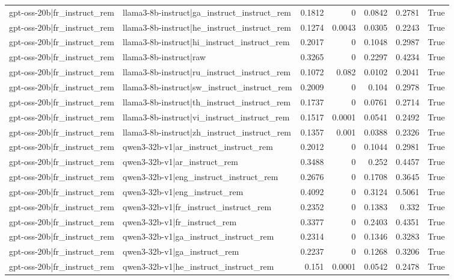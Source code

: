 \begin{table}
\begin{tabular}{l l r r r r l}
gpt-oss-20b|fr_instruct_rem & llama3-8b-instruct|ga_instruct_instruct_rem & 0.1812 & 0 & 0.0842 & 0.2781 & True \\
gpt-oss-20b|fr_instruct_rem & llama3-8b-instruct|he_instruct_instruct_rem & 0.1274 & 0.0043 & 0.0305 & 0.2243 & True \\
gpt-oss-20b|fr_instruct_rem & llama3-8b-instruct|hi_instruct_instruct_rem & 0.2017 & 0 & 0.1048 & 0.2987 & True \\
gpt-oss-20b|fr_instruct_rem & llama3-8b-instruct|raw & 0.3265 & 0 & 0.2297 & 0.4234 & True \\
gpt-oss-20b|fr_instruct_rem & llama3-8b-instruct|ru_instruct_instruct_rem & 0.1072 & 0.082 & 0.0102 & 0.2041 & True \\
gpt-oss-20b|fr_instruct_rem & llama3-8b-instruct|sw_instruct_instruct_rem & 0.2009 & 0 & 0.104 & 0.2978 & True \\
gpt-oss-20b|fr_instruct_rem & llama3-8b-instruct|th_instruct_instruct_rem & 0.1737 & 0 & 0.0761 & 0.2714 & True \\
gpt-oss-20b|fr_instruct_rem & llama3-8b-instruct|vi_instruct_instruct_rem & 0.1517 & 0.0001 & 0.0541 & 0.2492 & True \\
gpt-oss-20b|fr_instruct_rem & llama3-8b-instruct|zh_instruct_instruct_rem & 0.1357 & 0.001 & 0.0388 & 0.2326 & True \\
gpt-oss-20b|fr_instruct_rem & qwen3-32b-v1|ar_instruct_instruct_rem & 0.2012 & 0 & 0.1044 & 0.2981 & True \\
gpt-oss-20b|fr_instruct_rem & qwen3-32b-v1|ar_instruct_rem & 0.3488 & 0 & 0.252 & 0.4457 & True \\
gpt-oss-20b|fr_instruct_rem & qwen3-32b-v1|eng_instruct_instruct_rem & 0.2676 & 0 & 0.1708 & 0.3645 & True \\
gpt-oss-20b|fr_instruct_rem & qwen3-32b-v1|eng_instruct_rem & 0.4092 & 0 & 0.3124 & 0.5061 & True \\
gpt-oss-20b|fr_instruct_rem & qwen3-32b-v1|fr_instruct_instruct_rem & 0.2352 & 0 & 0.1383 & 0.332 & True \\
gpt-oss-20b|fr_instruct_rem & qwen3-32b-v1|fr_instruct_rem & 0.3377 & 0 & 0.2403 & 0.4351 & True \\
gpt-oss-20b|fr_instruct_rem & qwen3-32b-v1|ga_instruct_instruct_rem & 0.2314 & 0 & 0.1346 & 0.3283 & True \\
gpt-oss-20b|fr_instruct_rem & qwen3-32b-v1|ga_instruct_rem & 0.2237 & 0 & 0.1268 & 0.3206 & True \\
gpt-oss-20b|fr_instruct_rem & qwen3-32b-v1|he_instruct_instruct_rem & 0.151 & 0.0001 & 0.0542 & 0.2478 & True \\

\end{tabular}
\end{table}
